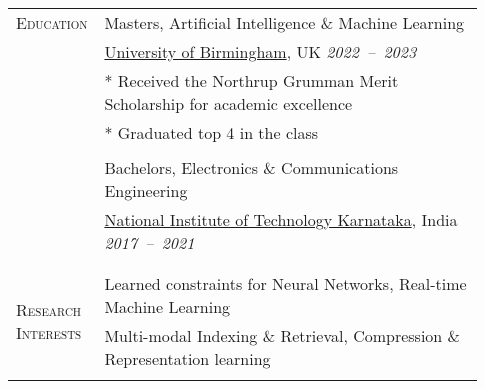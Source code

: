 \documentclass[letterpaper, 10pt, oneside]{article}
\newcommand{\stitle}[1]{\normalsize{\textsc{#1}}}
\begin{document}
\begin{longtable}{@{} p{0.13\linewidth} p{0.8\linewidth}}
    \stitle{Education}                                & {Masters, Artificial Intelligence \& Machine Learning}  \hfill 
    \\
                                                      & \href{https://birmingham.ac.uk}{University of Birmingham}, UK \hfill \textsl{2022\ --\ 2023}                                                                                                          \\
                                                      & * Received the Northrup Grumman Merit Scholarship for academic excellence \\
                                                      & * Graduated top 4 in the class \\
    \\[-1.5ex]
                                                      & {Bachelors, Electronics \& Communications Engineering}                                                                                                                                   \\
                                                      & \href{https://nitk.ac.in}{National Institute of Technology Karnataka}, India \hfill \hspace{-3em} \textsl{2017\ --\ 2021}                                                                             \\
    \\[-1.5ex]
    \\

    \multirow{2}{5em}{\stitle{Research Interests}}    & Learned constraints for Neural Networks, Real-time Machine Learning                                                                                                                                                             \\
                                                      & Multi-modal Indexing \& Retrieval, Compression \& Representation learning
    \\
    \\



\end{longtable}
\end{document}
